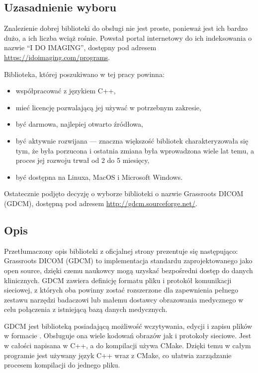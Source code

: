 

\subsection{Uzasadnienie wyboru}

\par
Znalezienie dobrej biblioteki do obsługi nie jest proste, ponieważ jest ich bardzo dużo, a ich liczba wciąż rośnie.
Powstał portal internetowy do ich indeksowania o nazwie \enquote{I DO IMAGING}, dostępny pod adresem \url{https://idoimaging.com/programs}.
\par
Biblioteka, której poszukiwano w tej pracy powinna:
\begin{itemize}
    \item współpracować z językiem C++,
    \item mieć licencję pozwalającą jej używać w potrzebnym zakresie,
    \item być darmowa, najlepiej otwarto źródłowa,
    \item być aktywnie rozwijana --- znaczna większość bibliotek charakteryzowała się tym, że była porzucona i ostatnia zmiana była wprowadzona wiele lat temu, a proces jej rozwoju trwał od 2 do 5 miesięcy,
    \item być dostępna na Linuxa, MacOS i Microsoft Windows.
\end{itemize}
Ostatecznie podjęto decyzję o wyborze biblioteki o nazwie Grassroots DICOM (GDCM), dostępną pod adresem \url{http://gdcm.sourceforge.net/}.

\subsection{Opis}

\par
Przetłumaczony opis biblioteki z oficjalnej strony prezentuje się następująco:
Grassroots DICOM (GDCM) to implementacja standardu \DICOM zaprojektowanego jako open source, dzięki czemu naukowcy mogą uzyskać bezpośredni dostęp do danych klinicznych.
GDCM zawiera definicję formatu pliku i protokół komunikacji sieciowej, z których oba powinny zostać rozszerzone dla zapewnienia pełnego zestawu narzędzi badaczowi lub małemu dostawcy obrazowania medycznego w celu połączenia z istniejącą bazą danych medycznych.

\par
GDCM jest biblioteką posiadającą możliwość wczytywania, edycji i zapisu plików w formacie \DICOM.
Obsługuje ona wiele kodowań obrazów jak i protokoły sieciowe.
Jest w całości napisana w C++, a do kompilacji używa CMake.
Dzięki temu w całym programie jest używany język C++ wraz z CMake, co ułatwia zarządzanie procesem kompilacji do jednego pliku.

